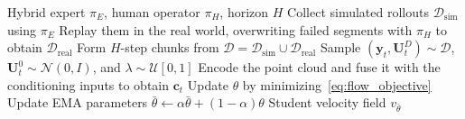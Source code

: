 \begin{algorithm}[t]
  \caption{Offline flow distillation with human intervention}
  \label{alg:method}
  \begin{algorithmic}[1]
    \REQUIRE Hybrid expert $\pi_E$, human operator $\pi_H$, horizon $H$
    \STATE Collect simulated rollouts $\mathcal D_{\mathrm{sim}}$ using $\pi_E$
    \STATE Replay them in the real world, overwriting failed segments with
      $\pi_H$ to obtain $\mathcal D_{\mathrm{real}}$
    \STATE Form $H$-step chunks from
      $\mathcal D=\mathcal D_{\mathrm{sim}}\cup\mathcal D_{\mathrm{real}}$
    \REPEAT
      \STATE Sample $(\mathbf{y}_t,\mathbf{U}_t^D)\sim\mathcal D$,
        $\mathbf{U}_t^0\sim\mathcal N(0,I)$, and $\lambda\sim\mathcal U[0,1]$
      \STATE Encode the point cloud and fuse it with the conditioning inputs
        to obtain $\mathbf{c}_t$
      \STATE Update $\theta$ by minimizing~\eqref{eq:flow_objective}
      \STATE Update EMA parameters
        $\bar\theta\leftarrow\alpha\bar\theta+(1-\alpha)\theta$
    \RETURN Student velocity field $v_{\bar\theta}$
  \end{algorithmic}
\end{algorithm}
